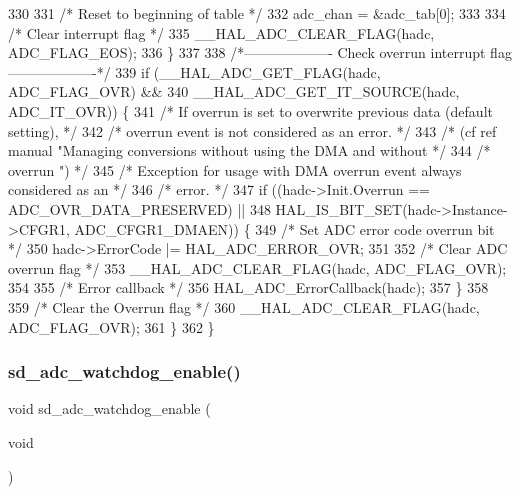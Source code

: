 \begin{DoxyCode}
330         
331         \textcolor{comment}{/* Reset to beginning of table */}
332         adc\_chan = &adc\_tab[0];
333 
334         \textcolor{comment}{/* Clear interrupt flag */}
335         \_\_HAL\_ADC\_CLEAR\_FLAG(hadc, ADC\_FLAG\_EOS);
336     \}
337   
338     \textcolor{comment}{/*------------------- Check overrun interrupt flag -------------------*/}
339     \textcolor{keywordflow}{if} (\_\_HAL\_ADC\_GET\_FLAG(hadc, ADC\_FLAG\_OVR) &&
340         \_\_HAL\_ADC\_GET\_IT\_SOURCE(hadc, ADC\_IT\_OVR)) \{
341         \textcolor{comment}{/* If overrun is set to overwrite previous data (default setting),        */}
342         \textcolor{comment}{/* overrun event is not considered as an error.                           */}
343         \textcolor{comment}{/* (cf ref manual "Managing conversions without using the DMA and without */}
344         \textcolor{comment}{/* overrun ")                                                             */}
345         \textcolor{comment}{/* Exception for usage with DMA overrun event always considered as an     */}
346         \textcolor{comment}{/* error.                                                                 */}
347         \textcolor{keywordflow}{if} ((hadc->Init.Overrun == ADC\_OVR\_DATA\_PRESERVED) ||
348             HAL\_IS\_BIT\_SET(hadc->Instance->CFGR1, ADC\_CFGR1\_DMAEN)) \{
349             \textcolor{comment}{/* Set ADC error code overrun bit */}
350             hadc->ErrorCode |= HAL\_ADC\_ERROR\_OVR;
351       
352             \textcolor{comment}{/* Clear ADC overrun flag */}
353             \_\_HAL\_ADC\_CLEAR\_FLAG(hadc, ADC\_FLAG\_OVR);
354       
355             \textcolor{comment}{/* Error callback */} 
356             HAL\_ADC\_ErrorCallback(hadc);
357         \}
358     
359         \textcolor{comment}{/* Clear the Overrun flag */}
360         \_\_HAL\_ADC\_CLEAR\_FLAG(hadc, ADC\_FLAG\_OVR);
361     \}
362 \}
\end{DoxyCode}
\mbox{\label{group___s_d___a_d_c___functions_ga78d41bf72512fd19ce879a78f158cb42}} 
\subsubsection{\texorpdfstring{sd\+\_\+adc\+\_\+watchdog\+\_\+enable()}{sd\_adc\_watchdog\_enable()}}
{\footnotesize\ttfamily void sd\+\_\+adc\+\_\+watchdog\+\_\+enable (\begin{DoxyParamCaption}\item[{void}]{ }\end{DoxyParamCaption})}



